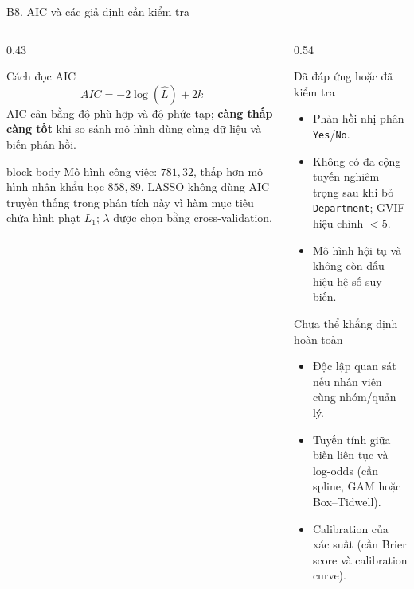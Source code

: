 \documentclass[10pt,aspectratio=169]{beamer}
\begin{document}
\begin{frame}{B8. AIC và các giả định cần kiểm tra}
  \begin{columns}[T,onlytextwidth]
    \begin{column}{0.43\textwidth}
      \begin{block}{Cách đọc AIC}
        \small
        \[
          AIC=-2\log(\widehat L)+2k
        \]
        AIC cân bằng độ phù hợp và độ phức tạp; \textbf{càng thấp càng
        tốt} khi so sánh mô hình dùng cùng dữ liệu và biến phản hồi.
      \end{block}
      \vspace{0.12cm}
      \begin{beamercolorbox}[sep=0.14cm,rounded=true]{block body}
        \small
        Mô hình công việc: \(781,32\), thấp hơn mô hình nhân khẩu học
        \(858,89\). LASSO không dùng AIC truyền thống trong phân tích này
        vì hàm mục tiêu chứa hình phạt \(L_1\); \(\lambda\) được chọn bằng
        cross-validation.
      \end{beamercolorbox}
    \end{column}
    \begin{column}{0.54\textwidth}
      \begin{block}{Đã đáp ứng hoặc đã kiểm tra}
        \small
        \begin{itemize}
          \item Phản hồi nhị phân \texttt{Yes}/\texttt{No}.
          \item Không có đa cộng tuyến nghiêm trọng sau khi bỏ
                \texttt{Department}; GVIF hiệu chỉnh \(<5\).
          \item Mô hình hội tụ và không còn dấu hiệu hệ số suy biến.
        \end{itemize}
      \end{block}
      \vspace{0.10cm}
      \begin{block}{Chưa thể khẳng định hoàn toàn}
        \small
        \begin{itemize}
          \item Độc lập quan sát nếu nhân viên cùng nhóm/quản lý.
          \item Tuyến tính giữa biến liên tục và log-odds
                (cần spline, GAM hoặc Box--Tidwell).
          \item Calibration của xác suất (cần Brier score và
                calibration curve).
        \end{itemize}
      \end{block}
    \end{column}
  \end{columns}
\end{frame}
\end{document}
